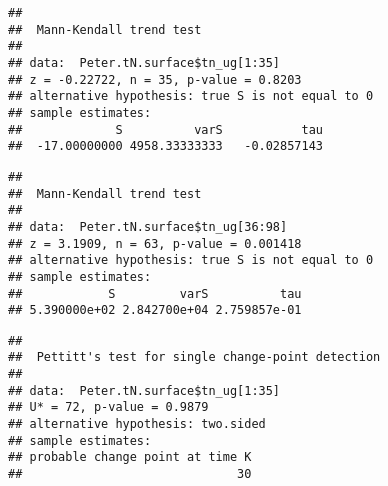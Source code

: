 \documentclass[]{article}
\newenvironment{Shaded}{\begin{snugshade}}{\end{snugshade}}
\newcommand{\KeywordTok}[1]{\textcolor[rgb]{0.13,0.29,0.53}{\textbf{#1}}}
\newcommand{\DecValTok}[1]{\textcolor[rgb]{0.00,0.00,0.81}{#1}}
\newcommand{\CommentTok}[1]{\textcolor[rgb]{0.56,0.35,0.01}{\textit{#1}}}
\newcommand{\OperatorTok}[1]{\textcolor[rgb]{0.81,0.36,0.00}{\textbf{#1}}}
\newcommand{\NormalTok}[1]{#1}
\begin{document}
\begin{verbatim}
## 
##  Mann-Kendall trend test
## 
## data:  Peter.tN.surface$tn_ug[1:35]
## z = -0.22722, n = 35, p-value = 0.8203
## alternative hypothesis: true S is not equal to 0
## sample estimates:
##             S          varS           tau 
##  -17.00000000 4958.33333333   -0.02857143
\end{verbatim}

\begin{Shaded}
\end{Shaded}

\begin{verbatim}
## 
##  Mann-Kendall trend test
## 
## data:  Peter.tN.surface$tn_ug[36:98]
## z = 3.1909, n = 63, p-value = 0.001418
## alternative hypothesis: true S is not equal to 0
## sample estimates:
##            S         varS          tau 
## 5.390000e+02 2.842700e+04 2.759857e-01
\end{verbatim}

\begin{Shaded}
\end{Shaded}

\begin{verbatim}
## 
##  Pettitt's test for single change-point detection
## 
## data:  Peter.tN.surface$tn_ug[1:35]
## U* = 72, p-value = 0.9879
## alternative hypothesis: two.sided
## sample estimates:
## probable change point at time K 
##                              30
\end{verbatim}
\end{document}
